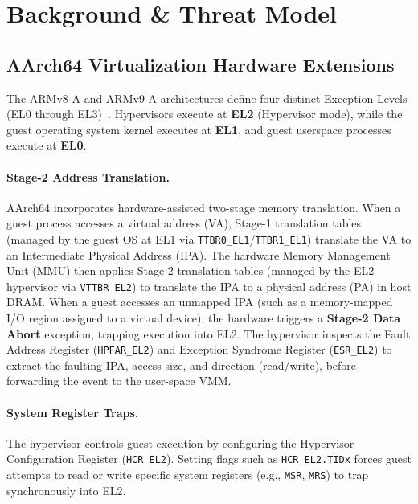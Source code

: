 \documentclass{article}
\begin{document}
\section{Background \& Threat Model}\label{sec:background}

\subsection{AArch64 Virtualization Hardware Extensions}
The ARMv8-A and ARMv9-A architectures define four distinct Exception Levels (EL0 through EL3)~\cite{arm_armv8}. Hypervisors execute at \textbf{EL2} (Hypervisor mode), while the guest operating system kernel executes at \textbf{EL1}, and guest userspace processes execute at \textbf{EL0}.

\paragraph{Stage-2 Address Translation.}
AArch64 incorporates hardware-assisted two-stage memory translation. When a guest process accesses a virtual address (VA), Stage-1 translation tables (managed by the guest OS at EL1 via \texttt{TTBR0\_EL1}/\texttt{TTBR1\_EL1}) translate the VA to an Intermediate Physical Address (IPA). The hardware Memory Management Unit (MMU) then applies Stage-2 translation tables (managed by the EL2 hypervisor via \texttt{VTTBR\_EL2}) to translate the IPA to a physical address (PA) in host DRAM.
When a guest accesses an unmapped IPA (such as a memory-mapped I/O region assigned to a virtual device), the hardware triggers a \textbf{Stage-2 Data Abort} exception, trapping execution into EL2. The hypervisor inspects the Fault Address Register (\texttt{HPFAR\_EL2}) and Exception Syndrome Register (\texttt{ESR\_EL2}) to extract the faulting IPA, access size, and direction (read/write), before forwarding the event to the user-space VMM.

\paragraph{System Register Traps.}
The hypervisor controls guest execution by configuring the Hypervisor Configuration Register (\texttt{HCR\_EL2}). Setting flags such as \texttt{HCR\_EL2.TIDx} forces guest attempts to read or write specific system registers (e.g., \texttt{MSR}, \texttt{MRS}) to trap synchronously into EL2.
\end{document}
